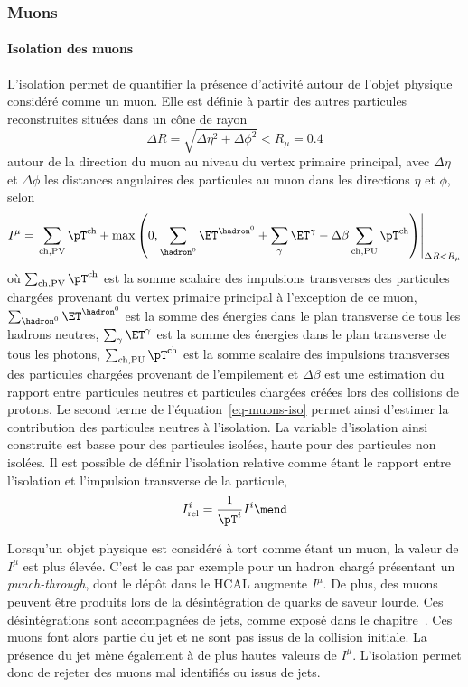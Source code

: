 \subsubsection{Muons}
\paragraph{Isolation des muons}
L'isolation permet de quantifier la présence d'activité autour de l'objet physique considéré comme un muon.
Elle est définie à partir des autres particules reconstruites situées dans un cône de rayon
\begin{equation}
\Delta R = \sqrt{\Delta\eta^2+\Delta\phi^2} < R_\mu=\num{0.4}
\end{equation}
autour de la direction du muon au niveau du vertex primaire principal,
avec $\Delta\eta$ et $\Delta\phi$ les distances angulaires des particules au muon dans les directions $\eta$ et $\phi$,
selon
\begin{equation}
I^{\mu}
=
\left.
\sum_{\text{ch},\text{PV}} \pT^{\text{ch}}
+
\max\left(
0
,
\sum_{\hadron^0}\ET^{\hadron^0}
+
\sum_{\gamma}\ET^{\gamma}
- \Delta\beta
\sum_{\text{ch},\text{PU}} \pT^{\text{ch}}
\right)
\right|_{\Delta R < R_\mu}
\label{eq-muons-iso}
\end{equation}
où
$\sum_{\text{ch},\text{PV}} \pT^{\text{ch}}$ est la somme scalaire des impulsions transverses des particules chargées provenant du vertex primaire principal à l'exception de ce muon,
$\sum_{\hadron^0}\ET^{\hadron^0}$ est la somme des énergies dans le plan transverse de tous les hadrons neutres,
$\sum_{\gamma}\ET^{\gamma}$ est la somme des énergies dans le plan transverse de tous les photons,
$\sum_{\text{ch},\text{PU}} \pT^{\text{ch}}$ est la somme scalaire des impulsions transverses des particules chargées provenant de l'empilement et
$\Delta\beta$ est une estimation du rapport entre particules neutres et particules chargées créées lors des collisions de protons.
Le second terme de l'équation~\eqref{eq-muons-iso} permet ainsi d'estimer la contribution des particules neutres à l'isolation.
La variable d'isolation ainsi construite est basse pour des particules isolées, haute pour des particules non isolées.
Il est possible de définir l'isolation relative comme étant le rapport entre l'isolation et l'impulsion transverse de la particule,
\begin{equation}
I_\text{rel}^{i}
=
\frac{1}{\pT^{i}}
I^{i}
\mend
\label{eq-muons-reliso}
\end{equation}
\par
Lorsqu'un objet physique est considéré à tort comme étant un muon,
la valeur de $I^{\mu}$ est plus élevée.
C'est le cas par exemple pour un hadron chargé présentant un \emph{punch-through},
dont le dépôt dans le HCAL augmente $I^{\mu}$.
De plus, des muons peuvent être produits lors de la désintégration de quarks de saveur lourde.
Ces désintégrations sont accompagnées de jets, comme exposé dans le chapitre~.
Ces muons font alors partie du jet et ne sont pas issus de la collision initiale.
La présence du jet mène également à de plus hautes valeurs de $I^{\mu}$.
L'isolation permet donc de rejeter des muons mal identifiés ou issus de jets.
